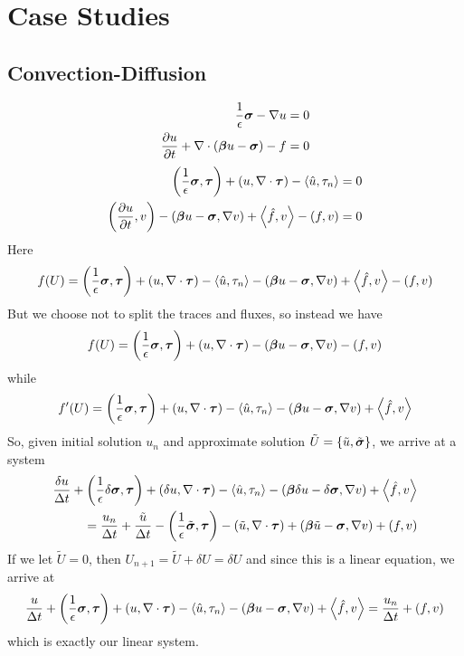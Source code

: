 \documentclass{article}
\begin{document}
\section*{Case Studies}
\subsection*{Convection-Diffusion}
\begin{align*}
  \frac{1}{\epsilon}\boldsymbol\sigma-\nabla u&=0\\
  \frac{\partial u}{\partial t}+\nabla\cdot(\boldsymbol\beta u-\boldsymbol\sigma)-f&=0
\end{align*}
\begin{align*}
  \left( \frac{1}{\epsilon}\boldsymbol\sigma,\boldsymbol\tau \right)+\left( u,\nabla\cdot\boldsymbol\tau \right)-\left\langle \hat u,\tau_n \right\rangle&=0\\
  \left( \frac{\partial u}{\partial t},v \right)-\left( \boldsymbol\beta u-\boldsymbol\sigma,\nabla v \right)+\left\langle \hat f,v \right\rangle-(f,v)&=0
\end{align*}
Here
\[
f(U)=\left( \frac{1}{\epsilon}\boldsymbol\sigma,\boldsymbol\tau \right)+\left( u,\nabla\cdot\boldsymbol\tau \right)-\left\langle \hat u,\tau_n \right\rangle
-\left( \boldsymbol\beta u-\boldsymbol\sigma,\nabla v \right)+\left\langle \hat f,v \right\rangle-(f,v)
\]
But we choose not to split the traces and fluxes, so instead we have
\[
f(U)=\left( \frac{1}{\epsilon}\boldsymbol\sigma,\boldsymbol\tau \right)+\left( u,\nabla\cdot\boldsymbol\tau \right)
-\left( \boldsymbol\beta u-\boldsymbol\sigma,\nabla v \right)-(f,v)
\]
while
\[
f'(U)=\left( \frac{1}{\epsilon}\boldsymbol\sigma,\boldsymbol\tau \right)+\left( u,\nabla\cdot\boldsymbol\tau \right)-\left\langle \hat u,\tau_n \right\rangle
-\left( \boldsymbol\beta u-\boldsymbol\sigma,\nabla v \right)+\left\langle \hat f,v \right\rangle
\]
So, given initial solution $u_n$ and approximate solution $\tilde U=\{\tilde
u,\tilde{\boldsymbol\sigma}\}$, we
arrive at a system
\begin{align*}
\frac{\delta u}{\Delta t}
+\left( \frac{1}{\epsilon}\delta\boldsymbol\sigma,\boldsymbol\tau \right)
+\left( \delta u,\nabla\cdot\boldsymbol\tau \right)-\left\langle \hat u,\tau_n \right\rangle
-\left( \boldsymbol\beta \delta u-\delta\boldsymbol\sigma,\nabla v \right)
+\left\langle \hat f,v \right\rangle
\\=
\frac{u_n}{\Delta t}
+\frac{\tilde u}{\Delta t}
-\left( \frac{1}{\epsilon}\tilde{\boldsymbol\sigma},\boldsymbol\tau \right)
-\left( \tilde u,\nabla\cdot\boldsymbol\tau \right)
+\left( \boldsymbol\beta \tilde u-\boldsymbol\sigma,\nabla v \right)
+(f,v)
\end{align*}
If we let $\tilde U=0$, then $U_{n+1}=\tilde U+\delta U=\delta U$ and since
this is a linear equation, we arrive at
\begin{align*}
\frac{u}{\Delta t}
+\left( \frac{1}{\epsilon}\boldsymbol\sigma,\boldsymbol\tau \right)
+\left( u,\nabla\cdot\boldsymbol\tau \right)-\left\langle \hat u,\tau_n \right\rangle
-\left( \boldsymbol\beta u-\boldsymbol\sigma,\nabla v \right)
+\left\langle \hat f,v \right\rangle
=
\frac{u_n}{\Delta t}
+(f,v)
\end{align*}
which is exactly our linear system.
\end{document}
